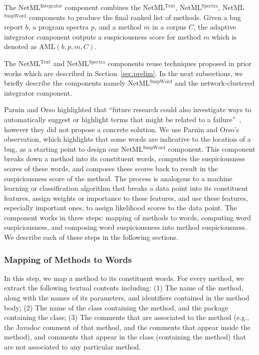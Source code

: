 The NetML$^\text{Integrator}$ component combines the NetML$^\text{Text}$, NetML$^\text{Spectra}$, NetML$^\text{SuspWord}$ components to produce the final ranked list of methods. Given a bug report $b$, a program spectra $p$, and a method $m$ in a corpus $C$, the adaptive integrator component outputs a suspiciousness score for method $m$ which is denoted as AML$(b,p,m,C)$.

The NetML$^\text{Text}$ and NetML$^\text{Spectra}$  components reuse techniques proposed in prior works which are described in Section~\ref{sec.prelim}. In the next subsections, we briefly describe the components namely NetML$^\text{SuspWord}$ and the network-clustered integrator component.

Parnin and Orso {highlighted} that ``future research could also investigate ways to automatically suggest or highlight terms that might be related to a failure''~\cite{ParninO11}, however they did not propose a concrete solution. We use Parnin and Orso's observation, which highlights that some words are indicative to the location of a bug, as a starting point to design our NetML$^\text{SuspWord}$ component. \iffalse NetML$^\text{SuspWord}$ component is designed based on this observation made by Parnin and Orso which highlights that some words are indicative to the location of a bug.\fi
This component breaks down a method into its constituent words, computes the suspiciousness scores of these words, and composes these scores back to result in the suspiciousness score of the method. The process is analogous to a machine learning or classification algorithm that breaks a data point into its constituent features, assign weights or importance to these features, and use these features, especially important ones, to assign likelihood scores to the data point. The component works in three steps: mapping of methods to words, computing word suspiciousness, and composing word suspiciousness into method suspiciousness. We describe each of these steps in the following sections. 


\subsubsection{Mapping of Methods to Words}
In this step, we map a method to its constituent words. For every method, we extract the following textual contents including: (1) The name of the method, along with the names of its parameters, and identifiers contained in the method body; (2) The name of the class containing the method, and the package containing the class; (3) The comments that are associated to the method (e.g., the Javadoc comment of that method, and the comments that appear inside the method), and comments that appear in the class (containing the method) that are not associated to any particular method.

